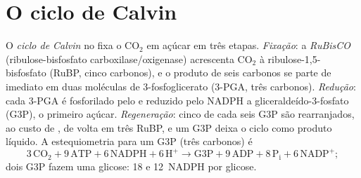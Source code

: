 \section{O ciclo de Calvin}

\begin{definition}\label{def:b1:photosynthesis:fixation}
O \emph{ciclo de Calvin} no  fixa o $\mathrm{CO_2}$ em açúcar em
três etapas. \emph{Fixação}: a \emph{RuBisCO} (ribulose-bisfosfato
carboxilase/oxigenase) acrescenta $\mathrm{CO_2}$ à
ribulose-1,5-bisfosfato (RuBP, cinco carbonos), e o produto de seis
carbonos se parte de imediato em duas moléculas de 3-fosfoglicerato
(3-PGA, três carbonos). \emph{Redução}: cada 3-PGA é fosforilado pelo
 e reduzido pelo NADPH a gliceraldeído-3-fosfato (G3P), o primeiro
açúcar. \emph{Regeneração}: cinco de cada seis G3P são rearranjados, ao
custo de , de volta em três RuBP, e um G3P deixa o ciclo como produto
líquido. A estequiometria para um G3P (três carbonos) é
\[
3\,\mathrm{CO_2} + 9\,\mathrm{ATP} + 6\,\mathrm{NADPH} + 6\,\mathrm{H^+}
\to \text{G3P} + 9\,\mathrm{ADP} + 8\,\mathrm{P_i} + 6\,\mathrm{NADP^+} ;
\]
dois G3P fazem uma glicose: \qty{18}{}  e \qty{12}{NADPH} por glicose.
\end{definition}

